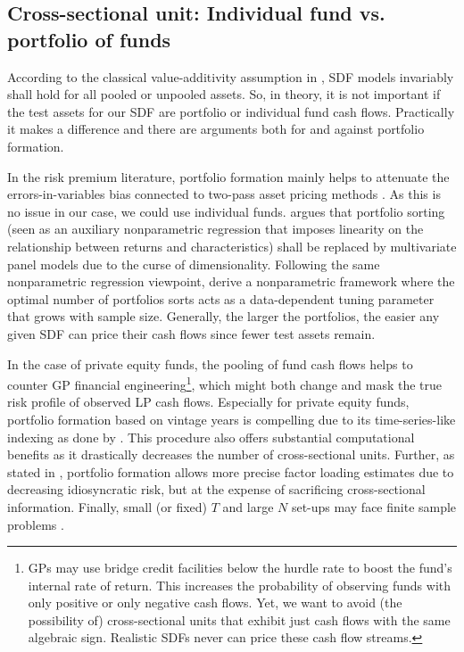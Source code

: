 \documentclass[12pt]{article}
\begin{document}
\subsection{Cross-sectional unit: Individual fund vs. portfolio of funds}
\label{sec:cross_sectional_unit}

According to the classical value-additivity assumption in \cite{HR87}, SDF models invariably shall hold for all pooled or unpooled assets.
So, in theory, it is not important if the test assets for our SDF are portfolio or individual fund cash flows.
Practically it makes a difference and there are arguments both for and against portfolio formation.

In the risk premium literature, portfolio formation mainly helps to attenuate the errors-in-variables bias connected to two-pass asset pricing methods \citep{JNPR19,PRS19}.
As this is no issue in our case, we could use individual funds.
\cite{C11} argues that portfolio sorting (seen as an auxiliary nonparametric regression that imposes linearity on the relationship between returns and characteristics) shall be replaced by multivariate panel models due to the curse of dimensionality.
Following the same nonparametric regression viewpoint, \cite{CCF19} derive a nonparametric framework where the optimal number of portfolios sorts acts as a data-dependent tuning parameter that grows with sample size.
Generally, the larger the portfolios, the easier any given SDF can price their cash flows since fewer test assets remain.

In the case of private equity funds, the pooling of fund cash flows helps to counter GP financial engineering\footnote{GPs may use bridge credit facilities below the hurdle rate to boost the fund's internal rate of return. This increases the probability of observing funds with only positive or only negative cash flows. Yet, we want to avoid (the possibility of) cross-sectional units that exhibit just cash flows with the same algebraic sign. Realistic SDFs never can price these cash flow streams.}, which might both change and mask the true risk profile of observed LP cash flows.
Especially for private equity funds, portfolio formation based on vintage years is compelling due to its time-series-like indexing as done by \cite{DLP12}.
This procedure also offers substantial computational benefits as it drastically decreases the number of cross-sectional units.
Further, as stated in \cite{ALS20}, portfolio formation allows more precise factor loading estimates  due to decreasing idiosyncratic risk, but at the expense of sacrificing cross-sectional information.
Finally, small (or fixed) $T$ and large $N$ set-ups may face finite sample problems \citep{RRZ20}.
\end{document}

